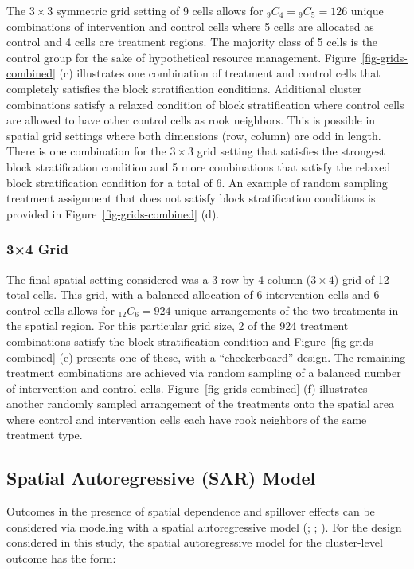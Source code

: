 \documentclass[
  12pt,
  prelim]{bios-prelim}
\begin{document}
The \(3\times3\) symmetric grid setting of 9 cells allows for
\({}_{9}C_{4} = {}_{9}C_{5} = 126\) unique combinations of intervention
and control cells where 5 cells are allocated as control and 4 cells are
treatment regions. The majority class of 5 cells is the control group
for the sake of hypothetical resource management.
Figure~\ref{fig-grids-combined} (c) illustrates one combination of
treatment and control cells that completely satisfies the block
stratification conditions. Additional cluster combinations satisfy a
relaxed condition of block stratification where control cells are
allowed to have other control cells as rook neighbors. This is possible
in spatial grid settings where both dimensions (row, column) are odd in
length. There is one combination for the \(3\times3\) grid setting that
satisfies the strongest block stratification condition and 5 more
combinations that satisfy the relaxed block stratification condition for
a total of 6. An example of random sampling treatment assignment that
does not satisfy block stratification conditions is provided in
Figure~\ref{fig-grids-combined} (d).

\subsubsection{3×4 Grid}\label{grid-2}

The final spatial setting considered was a 3 row by 4 column
(\(3\times4\)) grid of 12 total cells. This grid, with a balanced
allocation of 6 intervention cells and 6 control cells allows for
\(_{12}C_{6}=924\) unique arrangements of the two treatments in the
spatial region. For this particular grid size, 2 of the 924 treatment
combinations satisfy the block stratification condition and
Figure~\ref{fig-grids-combined} (e) presents one of these, with a
``checkerboard'' design. The remaining treatment combinations are
achieved via random sampling of a balanced number of intervention and
control cells. Figure~\ref{fig-grids-combined} (f) illustrates another
randomly sampled arrangement of the treatments onto the spatial area
where control and intervention cells each have rook neighbors of the
same treatment type.

\subsection{Spatial Autoregressive (SAR) Model}\label{sec-sar}

Outcomes in the presence of spatial dependence and spillover effects can
be considered via modeling with a spatial autoregressive model
(;
;
). For the design
considered in this study, the spatial autoregressive model for the
cluster-level outcome has the form:
\end{document}

